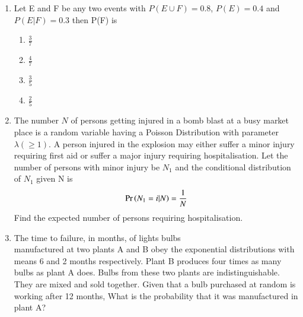 \documentclass[journal,12pt,twocolumn]{IEEEtran}
\begin{document}
\begin{enumerate}
%
\\
\solution
%
\item Let E and F be any two events with $P(E \cup F) = 0.8$, $P(E) = 0.4$ and $P(E|F) = 0.3$ then P(F) is \newline
\begin{enumerate}
\item $\frac{3}{7}$ 
\item $\frac{4}{7}$ 
\item $\frac{3}{5}$ 
\item $\frac{2}{5}$ 
\end{enumerate}
%
\solution

%
\item The number $N$ of persons getting injured in a bomb blast at a busy market place is a random variable having a Poisson Distribution with parameter $\lambda(\geq 1)$.
 A person injured in the explosion may either suffer a minor injury requiring first aid or suffer a major injury requiring hospitalisation. Let the number of persons with minor injury be $N_1$ and the conditional distribution of $N_1$ given N is
 \begin{align}
     \Pr\left(N_1 = i \vert N\right) = \frac{1}{N}
     \label{condition}
 \end{align}
 Find the expected number of persons requiring hospitalisation.
\solution

 \item The time to failure, in months, of lights bulbs \\manufactured at two plants A and B
obey the exponential distributions with means 6 and 2 months respectively. Plant B produces
four times as many bulbs as plant A does. Bulbs from these two plants are indistinguishable.
They are mixed and sold together. Given that a bulb purchased at random is working after 12 months, What is the probability that it was manufactured in plant A?
\\
\solution


\end{enumerate}
\end{document}
